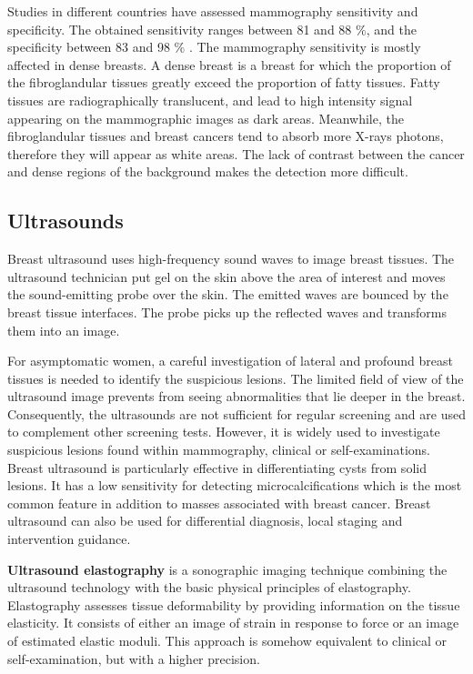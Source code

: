  
Studies in different countries have assessed mammography sensitivity and specificity. The obtained sensitivity ranges between 81 and 88 \%, and the specificity between 83 and 98 \% \citep{kemp_comparing_2015,hofvind_sensitivity_2012}. The mammography sensitivity is mostly affected in dense breasts. A dense breast is a breast for which the  proportion of the fibroglandular tissues greatly exceed the proportion of fatty tissues. Fatty tissues are radiographically translucent, and lead to high intensity signal appearing on the mammographic images as dark areas. Meanwhile, the fibroglandular tissues and breast cancers tend to absorb more X-rays photons, therefore they will appear as white areas. The lack of contrast between the cancer and dense regions of the background makes the detection more difficult.      
 
\subsection{Ultrasounds}\label{subsection:ultrasound}

Breast ultrasound uses high-frequency sound waves to image breast tissues. The ultrasound technician put gel on the skin above the area of interest and moves the sound-emitting probe over the skin. The emitted waves are bounced by the breast tissue interfaces. The probe picks up the reflected waves and transforms them into an image. 

For asymptomatic women, a careful investigation of lateral and profound breast tissues is needed to identify the suspicious lesions. The limited field of view of the ultrasound image prevents from seeing abnormalities that lie deeper in the breast. Consequently, the ultrasounds are not sufficient for regular screening and are used to complement other screening tests. However, it is widely used to investigate suspicious lesions found within mammography, clinical or self-examinations. Breast ultrasound is particularly effective in differentiating  cysts from solid lesions. It has a low sensitivity for detecting microcalcifications which is the most common feature in addition to masses associated with breast cancer. Breast ultrasound can also be used for differential diagnosis, local staging and intervention guidance.

\textbf{Ultrasound elastography} is a sonographic imaging technique combining the ultrasound technology with the basic physical principles of elastography. Elastography assesses tissue deformability by providing information on the tissue elasticity. It consists of either an image of strain in response to force or an image of estimated elastic moduli. This approach is somehow equivalent to clinical or self-examination, but with a higher precision.

